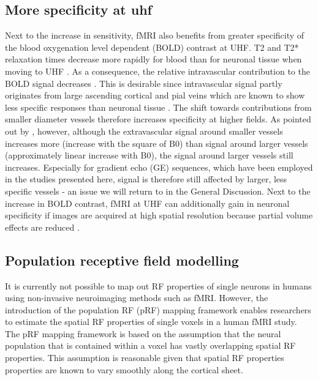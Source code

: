 \subsection{More specificity at uhf}
Next to the increase in sensitivity, fMRI also benefits from greater specificity of the blood oxygenation level dependent (BOLD) contrast at UHF. T2 and T2* relaxation times decrease more rapidly for blood than for neuronal tissue when moving to UHF \parencite{Ugurbil2002}. As a consequence, the relative intravascular contribution to the BOLD signal decreases \parencite{Uludag2009, Uludag2016}. This is desirable since intravascular signal partly originates from large ascending cortical and pial veins which are known to show less specific responses than neuronal tissue \parencite{DeMartino2016, Moerel2017}. The shift towards contributions from smaller diameter vessels therefore increases specificity at higher fields. As pointed out by \cite{DeMartino2016}, however, although the extravascular signal around smaller vessels increases more (increase with the square of B0) than signal around larger vessels (approximately linear increase with B0), the signal around larger vessels still increases. Especially for gradient echo (GE) sequences, which have been employed in the studies presented here, signal is therefore still affected by larger, less specific vessels - an issue we will return to in the General Discussion. Next to the increase in BOLD contrast, fMRI at UHF can additionally gain in neuronal specificity if images are acquired at high spatial resolution because partial volume effects are reduced \parencite{DeMartino2016}.

\subsection{Population receptive field modelling}
It is currently not possible to map out RF properties of single neurons in humans using non-invasive neuroimaging methods such as fMRI. However, the introduction of the population RF (pRF) mapping framework \parencite{Dumoulin2008} enables researchers to estimate the spatial RF properties of single voxels in a human fMRI study. The pRF mapping framework is based on the assumption that the neural population that is contained within a voxel has vastly overlapping spatial RF properties. This assumption is reasonable given that spatial RF properties properties are known to vary smoothly along the cortical sheet.

